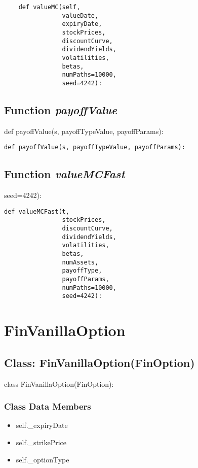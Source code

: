 \documentclass[twoside,11pt]{book}
\begin{document}
\begin{lstlisting}
    def valueMC(self,
                valueDate,
                expiryDate,
                stockPrices,
                discountCurve,
                dividendYields,
                volatilities,
                betas,
                numPaths=10000,
                seed=4242):
\end{lstlisting}

\subsection{Function {\it payoffValue}}
def payoffValue(s, payoffTypeValue, payoffParams):

\begin{lstlisting}
def payoffValue(s, payoffTypeValue, payoffParams):
\end{lstlisting}

\subsection{Function {\it valueMCFast}}
seed=4242):

\begin{lstlisting}
def valueMCFast(t,
                stockPrices,
                discountCurve,
                dividendYields,
                volatilities,
                betas,
                numAssets,
                payoffType,
                payoffParams,
                numPaths=10000,
                seed=4242):
\end{lstlisting}

\newpage
\section{FinVanillaOption}

\subsection{Class: FinVanillaOption(FinOption)}
class FinVanillaOption(FinOption):

\subsubsection{Class Data Members}
\begin{itemize}
\item{self.\_expiryDate}
\item{self.\_strikePrice}
\item{self.\_optionType}
\end{itemize}
\end{document}
